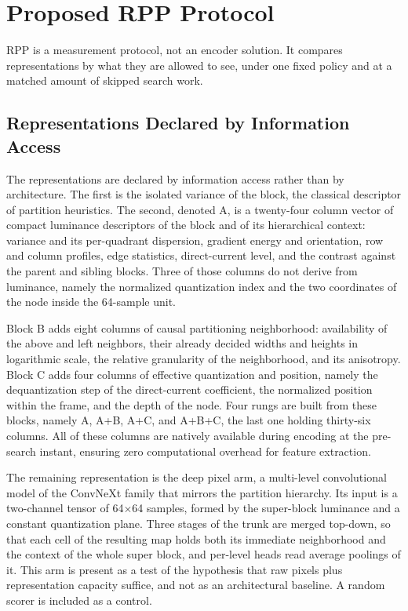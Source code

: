 \documentclass[conference]{IEEEtran}
\begin{document}
\section{Proposed RPP Protocol}

RPP is a measurement protocol, not an encoder solution. It compares
representations by what they are allowed to see, under one fixed policy and at a
matched amount of skipped search work.

\subsection{Representations Declared by Information Access}

The representations are declared by information access rather than by
architecture. The first is the isolated variance of the block, the
classical descriptor of partition heuristics. The second, denoted A, is a
twenty-four column vector of compact luminance descriptors of the block and of its
hierarchical context: variance and its per-quadrant dispersion, gradient energy
and orientation, row and column profiles, edge statistics, direct-current level,
and the contrast against the parent and sibling blocks. Three of those columns do
not derive from luminance, namely the normalized quantization index and the two
coordinates of the node inside the 64-sample unit.

Block B adds eight columns of causal partitioning neighborhood: availability of
the above and left neighbors, their already decided widths and heights in
logarithmic scale, the relative granularity of the neighborhood, and its
anisotropy. Block C adds four columns of effective quantization and position,
namely the dequantization step of the direct-current coefficient, the normalized
position within the frame, and the depth of the node. Four rungs are built from
these blocks, namely A, A+B, A+C, and A+B+C, the last one holding thirty-six
columns. All of these columns are natively available during encoding at the
pre-search instant, ensuring zero computational overhead for feature extraction.

The remaining representation is the deep pixel arm, a multi-level convolutional
model of the ConvNeXt family \cite{convnext} that mirrors the partition hierarchy.
Its input is a two-channel tensor of 64$\times$64 samples, formed by the
super-block luminance and a constant quantization plane. Three stages of the trunk
are merged top-down, so that each cell of the resulting map holds both its
immediate neighborhood and the context of the whole super block, and per-level
heads read average poolings of it. This arm is present as a test of the hypothesis
that raw pixels plus representation capacity suffice, and not as an architectural
baseline. A random scorer is included as a control.
\end{document}
